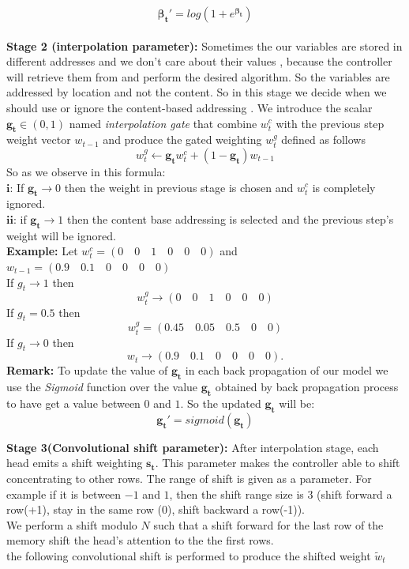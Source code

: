 \documentclass{amsart}
\numberwithin{equation}{section}
\theoremstyle{definition}
\theoremstyle{remark}
\begin{document}
$$\bm{\beta_t'}= log (1+e^{\bm{\beta_t}})$$\\
\textbf{Stage 2 (interpolation parameter):} Sometimes the our variables are stored in different addresses and we don't care about their values , because the controller will retrieve them from and perform the desired algorithm. So the variables are addressed by location and not the content. So in this stage we decide when we should use or ignore the content-based addressing . We introduce the scalar $\bm{g_t}\in(0,1)$ named \textit{interpolation gate} that combine $w_t^c$ with the previous step weight vector $w_{t-1}$ and produce the gated weighting  $w_t^g$ defined as follows
$$w_t^g \leftarrow \bm{g_t}w_t^c +(1-\bm{g_t})w_{t-1}$$
So as we observe in this formula:\\
$\textbf{i:}$ If $\bm{g_t}\rightarrow 0$ then the weight in previous stage is chosen and $w_t^c$ is completely ignored.\\
$\textbf{ii:}$ if $\bm{g_t}\rightarrow 1$ then the content base addressing is selected and the previous step's weight will be ignored.\\
\textbf{Example:} Let $w_t^c= (0 \quad 0 \quad 1\quad  0\quad 0 \quad 0)$ and $w_{t-1}= (0.9 \quad 0.1 \quad 0 \quad 0\quad 0\quad 0)$\\
If $g_t\to 1$ then
$$w_t^g \to (0\quad 0\quad 1\quad 0\quad 0\quad 0)$$
If $g_t= 0.5$ then
$$w_t^g= (0.45 \quad 0.05 \quad 0.5 \quad 0\quad 0)$$
If $g_t \to 0$ then
$$w_t \to (0.9 \quad 0.1 \quad 0\quad 0\quad 0\quad 0).$$
\textbf{Remark:} To update the value of $\bm{g_t}$ in each back propagation of our model we use the \textit{Sigmoid} function over the value $\bm{g_t}$ obtained by back propagation process to have get a  value between $0$ and $1$. So the updated $\bm{g_t}$ will be:
$$\bm{g_t'}=sigmoid(\bm{g_t})$$

\textbf{Stage 3(Convolutional shift parameter):} After interpolation stage, each head emits a shift weighting $\bm{s_t}$. This parameter makes the controller able to shift concentrating to other rows. The range of shift is given as a parameter. For example if it is between $-1$ and $1$, then the shift range size is $3$ (shift forward a row(+1), stay in the same row (0), shift backward a row(-1)).\\
We perform a shift modulo $N$ such that a shift forward for the last row of the memory shift the head's attention to the the first rows. \\
the following convolutional shift is performed to produce the shifted weight ${\tilde{w}_t}$
\end{document}
